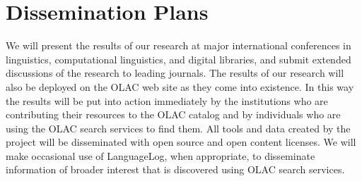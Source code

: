 \section{Dissemination Plans}
\label{sec:dissemination}

We will present the results of our research at major international
conferences in linguistics, computational linguistics, and
digital libraries, and submit extended discussions of the research to
leading journals.  The results of our research will also be deployed
on the OLAC web site as they come into existence. In this way the
results will be put into action immediately by the institutions
who are contributing their resources to the OLAC catalog and by 
individuals who are using the OLAC search services to find them.
All tools and data created by the project will be
disseminated with open source and open content licenses.
We will make occasional use of LanguageLog, when appropriate, to
disseminate information of broader interest that is discovered using
OLAC search services.
